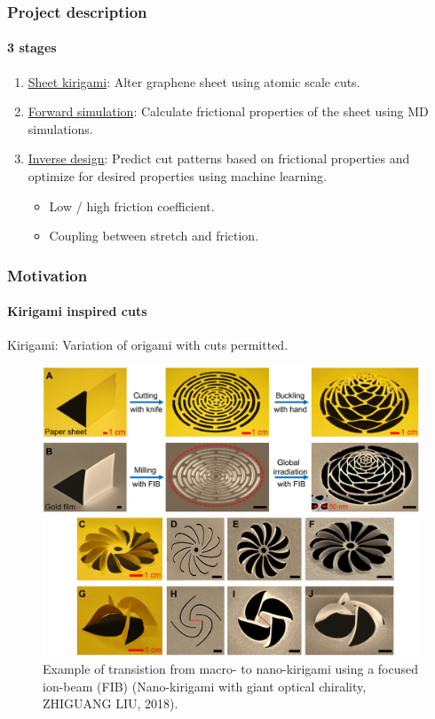 \documentclass[
	10pt, %
]{beamer}
\begin{document}
\begin{frame}
	\frametitle{Project description}
	\framesubtitle{3 stages}


	\begin{enumerate}
		\setlength\itemsep{2em}
		\item \underline{Sheet kirigami}: Alter graphene sheet using atomic scale cuts. %
		\item \underline{Forward simulation}: Calculate frictional properties of the sheet using MD simulations.
		\item \underline{Inverse design}: Predict cut patterns based on frictional properties and optimize for desired properties using machine learning.
		\begin{itemize}
			\item Low / high friction coefficient.
			\item Coupling between stretch and friction.
		\end{itemize} 
	

	\end{enumerate}

	
\end{frame}

\begin{frame}
	\frametitle{Motivation}
	\framesubtitle{Kirigami inspired cuts}

	Kirigami: Variation of origami with cuts permitted.

	\begin{figure}
		\includegraphics[width=0.6\linewidth]{figures/kirigami_example.jpeg}
		\caption{Example of transistion from macro- to nano-kirigami using a focused ion-beam (FIB) (Nano-kirigami with giant optical chirality, ZHIGUANG LIU, 2018).}
	\end{figure}	

\end{frame}
\end{document}
